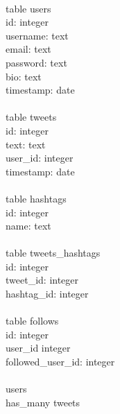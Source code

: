 \documentclass{article}
\begin{document}
	\hspace{0cm}
	\\
	table users \\
	\indent id: integer \\
	\indent username: text \\
	\indent email: text \\
	\indent password: text \\
	\indent bio: text \\
	\indent timestamp: date \\
	\\
	table tweets \\
	\indent id: integer \\
	\indent text: text \\
	\indent user\_id: integer \\
	\indent timestamp: date \\
	\\
	table hashtags \\
	\indent id: integer \\
	\indent name: text \\
	\\
	table tweets\_hashtags \\
	\indent id: integer \\
	\indent tweet\_id: integer \\
	\indent hashtag\_id: integer \\
	\\
	table follows \\
	\indent id: integer \\
	\indent user\_id\: integer \\
	\indent followed\_user\_id: integer \\
	\\
	users \\
	\indent has\_many tweets
	
\end{document}
